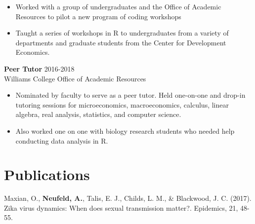 \documentclass[margin, 10pt]{res} %
\begin{document}
\begin{resume}
{\begin{itemize}
\item Worked with a group of undergraduates and the Office of Academic Resources to pilot a new program of coding workshops
\item Taught a series of workshops in R to undergraduates from a variety of departments and graduate students from the Center for Development Economics. 
\end{itemize}
{\textbf{Peer Tutor}} \hfill 2016-2018 \\
Williams College Office of Academic Resources
\begin{itemize}
\item Nominated by faculty to serve as a peer tutor. Held one-on-one and drop-in tutoring sessions for microeconomics, macroeconomics, calculus, linear algebra, real analysis, statistics, and computer science. 
\item Also worked one on one with biology research students who needed help conducting data analysis in R. 
\end{itemize}


\section{Publications} 
Maxian, O., \textbf{Neufeld, A.}, Talis, E. J., Childs, L. M., \& Blackwood, J. C. (2017). Zika virus dynamics: When does sexual transmission matter?. Epidemics, 21, 48-55.

 


}
\end{resume}
\end{document}
